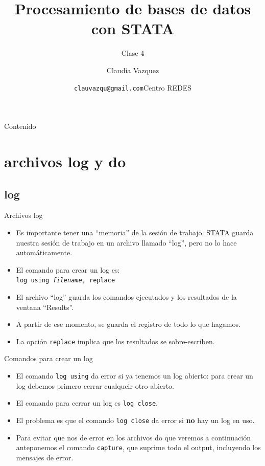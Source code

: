\documentclass{beamer}
\title[Clase 4]{Procesamiento de bases de datos con STATA}
\subtitle{Clase 4}
\author{Claudia Vazquez}
\date[]{\texttt{clauvazqu@gmail.com}Centro REDES}
\begin{document}
\begin{frame}
  \titlepage
\end{frame}

\begin{frame}{Contenido}
  \tableofcontents
 \end{frame}


\section{archivos log y do}
\subsection{log}
\begin{frame}{Archivos log}
\begin{itemize}
\item Es importante tener una ``memoria'' de la sesión de trabajo. STATA guarda nuestra sesión de trabajo en un archivo llamado ``log'', pero no lo hace automáticamente.
\item El comando para crear un log es:\\ {\footnotesize \texttt{log using \textit{filename}, replace}}
\item El archivo ``log'' guarda los comandos ejecutados y los resultados de la ventana ``Results''.
\item A partir de ese momento, se guarda el registro de todo lo que hagamos.
\item La opción \texttt{replace} implica que los resultados se sobre-escriben. 
\end{itemize}
\end{frame}

\begin{frame}{Comandos para crear un log}
\begin{itemize}
\item El comando \texttt{log using} da error si ya tenemos un log abierto: para crear un log debemos primero cerrar cualqueir otro abierto.
\item El comando para cerrar un log es \texttt{log close}.
\item El problema es que el comando \texttt{log close} da error si \textbf{no} hay un log en uso.
\item Para evitar que nos de error en los archivos do que veremos a continuación anteponemos el comando \texttt{capture}, que suprime todo el output, incluyendo los mensajes de error.
\end{itemize}
\end{frame}
\end{document}
